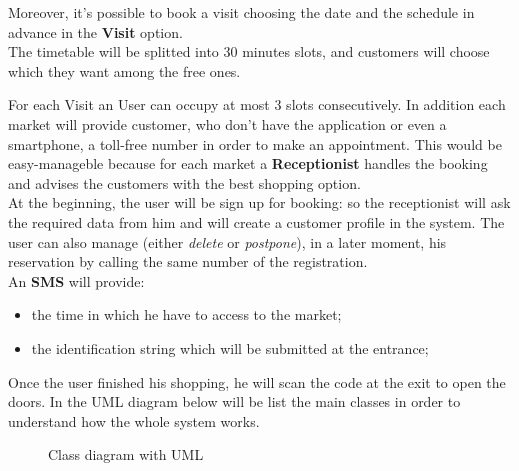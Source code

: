 \par
Moreover, it's possible to book a visit choosing the date and the schedule in advance in the \textbf{Visit} option. 
\\
The timetable will be splitted into 30 minutes slots, and customers will choose which they want among the free ones. \par
For each Visit an User can occupy at most 3 slots consecutively.
In addition each market will provide customer, who don't have the application or even a smartphone, a toll-free number in order to make an appointment.
This would be easy-manageble because for each market a \textbf{Receptionist} handles the booking and advises the customers with the best shopping option.\\
At the beginning, the user will be sign up for booking: so the receptionist will ask the required data from him and will create a customer profile in the system.
The user can also manage (either \textit{delete} or \textit{postpone}), in a later moment, his reservation by calling the same number of the registration.
\\
An \textbf{SMS} will provide:
\begin{itemize}
\item the time in which he have to access to the market;
\item the identification string which will be submitted at the entrance;
\end{itemize}

Once the user finished his shopping, he will scan the code at the exit to open the doors.
\bigskip
In the UML diagram below will be list the main classes in order to understand how the whole system works.

\par 
\bigskip
\bigskip
\begin{figure}[H]
  \centering
  \caption{Class diagram with UML}
   \label{class_diagram}
\end{figure}



